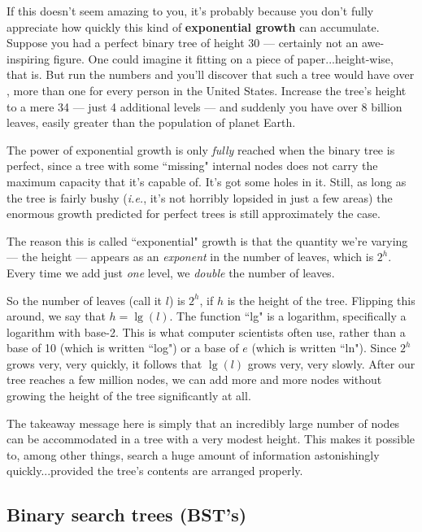 If this doesn't seem amazing to you, it's probably because you don't fully
appreciate how quickly this kind of \textbf{exponential growth} can
accumulate. Suppose you had a perfect binary tree of height 30 ---
certainly not an awe-inspiring figure. One could imagine it fitting on a
piece of paper...height-wise, that is. But run the numbers and you'll
discover that such a tree would have over , more
than one for every person in the United States. Increase the tree's height
to a mere 34 --- just 4 additional levels --- and suddenly you have over 8
billion leaves, easily greater than the population of planet Earth.

The power of exponential growth is only \textit{fully} reached when the
binary tree is perfect, since a tree with some ``missing" internal nodes
does not carry the maximum capacity that it's capable of. It's got some
holes in it. Still, as long as the tree is fairly bushy (\textit{i.e.},
it's not horribly lopsided in just a few areas) the enormous growth
predicted for perfect trees is still approximately the case.

The reason this is called ``exponential" growth is that the quantity we're
varying --- the height --- appears as an \textit{exponent} in the number of
leaves, which is $2^h$. Every time we add just \textit{one} level, we
\textit{double} the number of leaves. 

So the number of leaves (call it $l$) is $2^h$, if $h$ is the height of the
tree. Flipping this around, we say that $h = \lg(l)$. The function ``lg" is
a logarithm, specifically a logarithm with base-2. This is what computer
scientists often use, rather than a base of 10 (which is written ``log") or
a base of $e$ (which is written ``ln"). Since $2^h$ grows very, very
quickly, it follows that $\lg(l)$ grows very, very slowly. After our tree
reaches a few million nodes, we can add more and more nodes without growing
the height of the tree significantly at all.

The takeaway message here is simply that an incredibly large number of
nodes can be accommodated in a tree with a very modest height. This makes
it possible to, among other things, search a huge amount of information
astonishingly quickly...provided the tree's contents are arranged properly.

\subsection{Binary search trees (BST's)}

